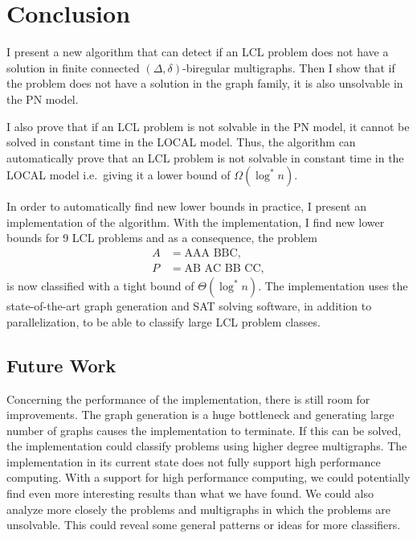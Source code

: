 
\section{Conclusion} \label{sec:conclusion}

I present a new algorithm that can detect if an LCL problem does not have a solution in finite connected $(\Delta, \delta)$-biregular multigraphs.
Then I show that if the problem does not have a solution in the graph family, it is also unsolvable in the PN model.

I also prove that if an LCL problem is not solvable in the PN model, it cannot be solved in constant time in the LOCAL model.
Thus, the algorithm can automatically prove that an LCL problem is not solvable in constant time in the LOCAL model i.e.\ giving it a lower bound of $\Omega(\log^* n)$.

In order to automatically find new lower bounds in practice, I present an implementation of the algorithm.
With the implementation, I find new lower bounds for 9 LCL problems and as a consequence, the problem
\begin{align*}
    A&=\text{AAA BBC},\\
    P&=\text{AB AC BB CC},
\end{align*}
is now classified with a tight bound of $\Theta(\log^* n)$.
The implementation uses the state-of-the-art graph generation and SAT solving software, in addition to parallelization, to be able to classify large LCL problem classes.

\subsection{Future Work}

Concerning the performance of the implementation, there is still room for improvements.
The graph generation is a huge bottleneck and generating large number of graphs causes the implementation to terminate.
If this can be solved, the implementation could classify problems using higher degree multigraphs.
The implementation in its current state does not fully support high performance computing.
With a support for high performance computing, we could potentially find even more interesting results than what we have found.
We could also analyze more closely the problems and multigraphs in which the problems are unsolvable.
This could reveal some general patterns or ideas for more classifiers.
